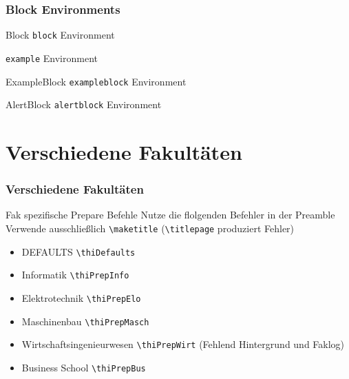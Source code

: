 \documentclass[aspectratio=169]{beamer}
\begin{document}
\begin{frame}
    \frametitle{Block Environments}
    \begin{block}{Block}
        \texttt{block} Environment
    \end{block}
    \begin{example}
        \texttt{example} Environment
    \end{example}
    \begin{exampleblock}{ExampleBlock}
        \texttt{exampleblock} Environment
    \end{exampleblock}
    \begin{alertblock}{AlertBlock}
        \texttt{alertblock} Environment
    \end{alertblock}
\end{frame}


\section{Verschiedene Fakultäten}
\begin{frame}
    \frametitle{Verschiedene Fakultäten}
    \begin{alertblock}{Fak spezifische Prepare Befehle}
        Nutze die flolgenden Befehler in der Preamble\\
        Verwende ausschließlich \texttt{\textbackslash maketitle} (\texttt{\textbackslash titlepage} produziert Fehler)
    \end{alertblock}
    \begin{itemize}
        \item \textcolor{thiblue}{DEFAULTS} \texttt \texttt{\textbackslash thiDefaults}
        \item \textcolor{\thifakinfocolor}{Informatik} \texttt{\textbackslash thiPrepInfo}
        \item \textcolor{\thifakelocolor}{Elektrotechnik} \texttt{\textbackslash thiPrepElo}
        \item \textcolor{\thifakmaschcolor}{Maschinenbau} \texttt{\textbackslash thiPrepMasch}
        \item \textcolor{\thifakwirtcolor}{Wirtschaftsingenieurwesen} \texttt{\textbackslash thiPrepWirt} (Fehlend Hintergrund und Faklog)
        \item \textcolor{\thifakbuscolor}{Business School} \texttt{\textbackslash thiPrepBus}
    \end{itemize}
\end{frame}
\end{document}
